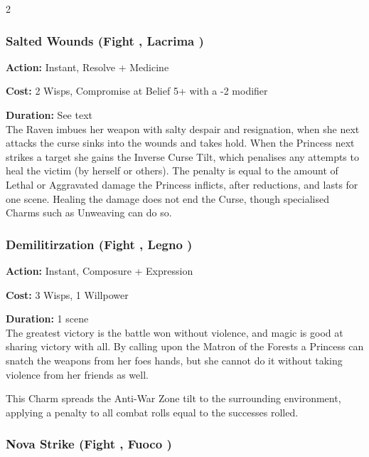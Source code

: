 \begin{multicols}{2}
\subsubsection*{Salted Wounds (Fight \textbullet\textbullet\textbullet, Lacrima \textbullet\textbullet\textbullet)}

\noindent \textbf{Action:} Instant, Resolve + Medicine

\noindent \textbf{Cost:} 2 Wisps, Compromise at Belief 5+ with a -2 modifier

\noindent \textbf{Duration:} See text\\

\noindent The Raven imbues her weapon with salty despair and resignation, when she next attacks the curse sinks into the wounds and takes hold. When the Princess next strikes a target she gains the Inverse Curse Tilt, which penalises any attempts to heal the victim (by herself or others). The penalty is equal to the amount of Lethal or Aggravated damage the Princess inflicts, after reductions, and lasts for one scene. Healing the damage does not end the Curse, though specialised Charms such as Unweaving can do so.

\subsubsection*{Demilitirzation (Fight \textbullet\textbullet\textbullet\textbullet, Legno \textbullet\textbullet\textbullet)}

\noindent \textbf{Action:} Instant, Composure + Expression

\noindent \textbf{Cost:} 3 Wisps, 1 Willpower

\noindent \textbf{Duration:} 1 scene\\

\noindent The greatest victory is the battle won without violence, and magic is good at sharing victory with all. By calling upon the Matron of the Forests a Princess can snatch the weapons from her foes hands, but she cannot do it without taking violence from her friends as well. 

This Charm spreads the Anti-War Zone tilt to the surrounding environment, applying a penalty to all combat rolls equal to the successes rolled. 

\subsubsection*{Nova Strike	(Fight \textbullet\textbullet\textbullet\textbullet\textbullet, Fuoco \textbullet\textbullet\textbullet\textbullet)}


\end{multicols}
